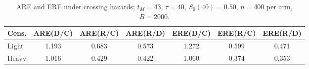 \begin{table}[ht]
\centering
\caption{ARE and ERE under crossing hazards; $t_M=43$, $\tau=40$, $S_0(40)=0.50$, $n=400$ per arm, $B=2000$.}
\label{tab:sim-crossing}
\begin{tabular}{lcccccc}
\toprule
Cens. & ARE(D/C) & ARE(R/C) & ARE(R/D) & ERE(D/C) & ERE(R/C) & ERE(R/D)
\\
\midrule
Light & 1.193 & 0.683 & 0.573 & 1.272 & 0.599 & 0.471 \\
\midrule
Heavy & 1.016 & 0.429 & 0.422 & 1.060 & 0.374 & 0.353 \\
\bottomrule
\end{tabular}
\end{table}
